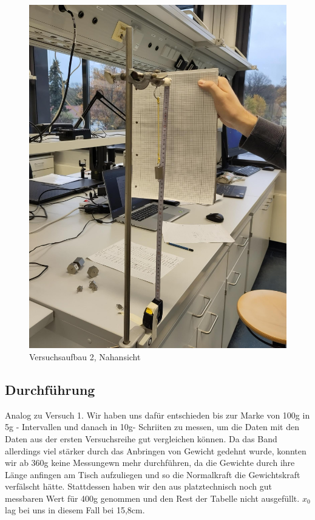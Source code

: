 \documentclass[
  9pt,
]{article}
\begin{document}
\begin{figure}
\centering
\includegraphics[width=\textwidth,height=0.2\textheight]{Bilder/V2B2.jpeg}
\caption{Versuchsaufbau 2, Nahansicht}
\end{figure}

\hypertarget{durchfuxfchrung-1}{%
\subsection{Durchführung}\label{durchfuxfchrung-1}}

Analog zu Versuch 1. Wir haben uns dafür entschieden bis zur Marke von
100g in 5g - Intervallen und danach in 10g- Schriiten zu messen, um die
Daten mit den Daten aus der ersten Versuchsreihe gut vergleichen können.
Da das Band allerdings viel stärker durch das Anbringen von Gewicht
gedehnt wurde, konnten wir ab 360g keine Messungewn mehr durchführen, da
die Gewichte durch ihre Länge anfingen am Tisch aufzuliegen und so die
Normalkraft die Gewichtskraft verfälscht hätte. Stattdessen haben wir
den aus platztechnisch noch gut messbaren Wert für 400g genommen und den
Rest der Tabelle nicht ausgefüllt. \(x_0\) lag bei uns in diesem Fall
bei 15,8cm.
\end{document}
